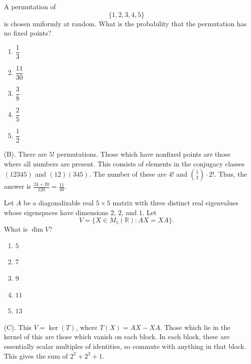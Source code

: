 \begin{exercise}
A permutation of
\[
\{1,2,3,4,5\}
\]
is chosen uniformly at random.
What is the probability that the permutation has no fixed points?
\begin{enumerate}[label=(\Alph*)]
    \item $\dfrac13$
    \item $\dfrac{11}{30}$
    \item $\dfrac38$
    \item $\dfrac25$
    \item $\dfrac12$
\end{enumerate}
\end{exercise}
\begin{solution}
(B). There are $5!$ permutations. Those which have nonfixed points are those where all numbers 
are present. This consists of elements in the conjugacy classes $(12345)$ and $(12)(345)$.
The number of these are $4!$ and ${5\choose 2}\cdot 2!$.
Thus, the answer is $\frac{24 + 20}{120} = \frac{11}{30}$.
\end{solution}


\begin{exercise}
Let $A$ be a diagonalizable real $5\times5$ matrix with three distinct real eigenvalues 
whose eigenspaces have dimensions $2$, $2$, and $1$. Let
\[
V=\{X\in M_5(\mathbb R):AX=XA\}.
\]
What is $\dim V$?
\begin{enumerate}[label=(\Alph*)]
    \item $5$
    \item $7$
    \item $9$
    \item $11$
    \item $13$
\end{enumerate}
\end{exercise}
\begin{solution}
(C). This $V = \ker(T)$, where $T(X) = AX - XA$. Those which lie in the 
kernel of this are those which vanish on each block. In each block, 
these are essentially scalar multiples of identities, so commute with anything 
in that block. This gives the sum of $2^2 + 2^2 + 1$.
\end{solution}


